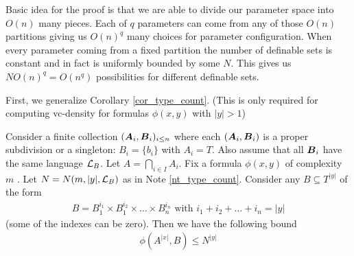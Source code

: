 \documentclass{amsart}
\DeclareMathOperator{\A}{\boldface A}
\DeclareMathOperator{\B}{\boldface B}
\begin{document}
Basic idea for the proof is that we are able to divide our parameter space into $O(n)$ many pieces. Each of $q$ parameters can come from any of those $O(n)$ partitions giving us $O(n)^q$ many choices for parameter configuration. When every parameter coming from a fixed partition the number of definable sets is constant and in fact is uniformly bounded by some $N$. This gives us $N O(n)^q = O(n^q)$ possibilities for different definable sets.

First, we generalize Corollary \ref{cor_type_count}. (This is only required for computing vc-density for formulas $\phi(x, y)$ with $|y| > 1$)

\begin{Lemma} \label{lm_partition_bound}
	Consider a finite collection $(\A_i, \B_i)_{i \leq n}$ where each $(\A_i, \B_i)$ is a proper subdivision or a singleton: $B_i = \{b_i\}$ with $A_i = T$. Also assume that all $\B_i$ have the same language $\mathcal L_B$. Let $A = \bigcap_{i \in I} A_i$. Fix a formula $\phi(x, y)$ of complexity $m$ . Let $N = N(m, |y|, \mathcal L_B)$ as in Note \ref{nt_type_count}. Consider any $B \subseteq T^{|y|}$ of the form
	\begin{align*}
		B = B_1^{i_1} \times B_1^{i_2} \times \ldots \times B_n^{i_n} \text { with } i_1 + i_2 + \ldots + i_n = |y|
	\end{align*}
	(some of the indexes can be zero). Then we have the following bound
	\begin{align*}
		\phi(A^{|x|}, B) \leq N^{|y|}
	\end{align*}
\end{Lemma}
\end{document}
